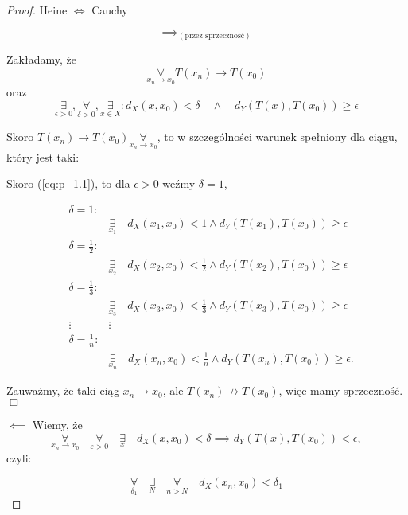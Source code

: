 \documentclass[../main.tex]{subfiles}
\begin{document}
\begin{proof}
    Heine $\iff$ Cauchy

    \[\implies_{(\text{przez sprzeczność})}\]

Zakładamy, że
    \[
        \underset{x_n \to x_0}{\forall} T(x_{n}) \to T(x_{0})
    \]
    oraz
    \begin{equation}
        \label{eq:p_1.1}
        \underset{\epsilon > 0}{\exists}, \underset{\delta > 0}{\forall}, \underset{x\in X}{\exists} : d_{X} (x,x_{0}) < \delta \quad\land\quad d_{Y} (T(x),T(x_{0})) \geq \epsilon
    \end{equation}

Skoro $T(x_{n})\to T(x_{0}) \underset{x_n \to x_0}{\forall}$, to w szczególności warunek spełniony dla ciągu, który jest taki:

    Skoro (\ref{eq:p_1.1}), to dla $\epsilon>0$ weźmy $\delta = 1$,

\begin{align*}
    &\delta=1:\\
    &&\underset{x_1}{\exists} \quad d_{X} (x_{1},x_{0})<1 \land d_{Y} (T(x_{1}), T(x_{0})) \geq \epsilon \\
    &\delta=\frac{1}{2}:\\
    &&\underset{x_2}{\exists} \quad d_{X} (x_{2},x_{0})<\frac{1}{2} \land d_{Y} (T(x_{2}), T(x_{0})) \geq \epsilon \\
    &\delta=\frac{1}{3}:\\
    &&\underset{x_3}{\exists} \quad d_{X} (x_{3},x_{0})<\frac{1}{3} \land d_{Y} (T(x_{3}), T(x_{0})) \geq \epsilon\\
    &\vdots &\vdots\\
    &\delta=\frac{1}{n}:\\
    &&\underset{x_n}{\exists} \quad d_{X}(x_{n},x_{0}) < \frac{1}{n} \land d_{Y} (T(x_{n}),T(x_{0})) \geq \epsilon
.\end{align*}

Zauważmy, że taki ciąg $x_{n} \to x_{0}$, ale $T(x_{n}) \not\rightarrow T(x_{0})$, więc mamy sprzeczność. $\Box$

    $\impliedby$ Wiemy, że
    \begin{equation}
        \label{eq:p_1.2}
        \underset{x_n\to x_0}{\forall}\quad \underset{\varepsilon > 0}{\forall}\quad \underset{x}{\exists}\quad d_{X} (x,x_{0}) < \delta \implies d_{Y} (T(x),T(x_{0})) < \epsilon
    ,
    \end{equation}
czyli:

\begin{equation}
    \label{eq:p_1.3}
    \underset{\delta_1}{\forall} \quad\underset{N}{\exists} \quad\underset{n>N}{\forall} \quad d_{X} (x_{n}, x_{0}) < \delta_{1}
\end{equation}


\end{proof}
\end{document}
